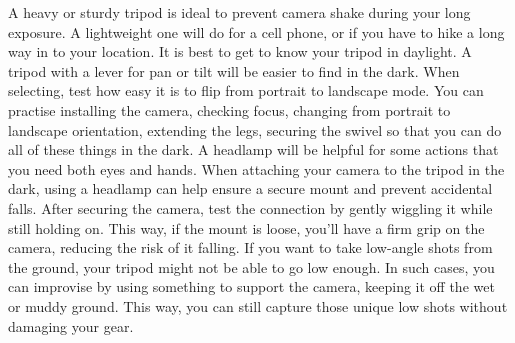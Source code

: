\documentclass{article}
\begin{document}
A heavy or sturdy tripod is ideal to prevent camera shake during your long exposure.  A lightweight one will do for a cell phone, or if you have to hike a long way in to your location.   It is best to get to know your tripod in daylight. A tripod with a lever for pan or tilt will be easier to find in the dark.   When selecting, test how easy it is to flip from portrait to landscape mode.  You can practise installing the camera, checking focus, changing from portrait to landscape orientation, extending the legs, securing the swivel so that you can do all of these things in the dark.  A headlamp will be helpful for some actions that you need both eyes and  hands.  When attaching your camera to the tripod in the dark, using a headlamp can help ensure a secure mount and prevent accidental falls. After securing the camera, test the connection by gently wiggling it while still holding on. This way, if the mount is loose, you'll have a firm grip on the camera, reducing the risk of it falling. If you want to take low-angle shots from the ground, your tripod might not be able to go low enough. In such cases, you can improvise by using something to support the camera, keeping it off the wet or muddy ground. This way, you can still capture those unique low shots without damaging your gear.
\end{document}
